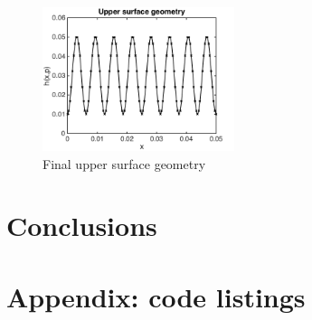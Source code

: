 \documentclass[11pt]{article}
\begin{document}
\begin{figure}[hbt]
\centering
\includegraphics[width=0.5\textwidth]{geometry}
\caption{Final upper surface geometry}
\label{fig:geometry}
\end{figure}

\section{Conclusions}

\newpage

\section{Appendix: code listings}



\newpage



\newpage


\end{document}
